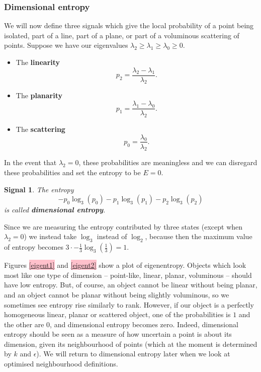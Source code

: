 \documentclass[a4paper,11pt,twoside]{article}
\newtheorem*{signals}{Signal}
\theoremstyle{definition}
\theoremstyle{remark}
\newcommand{\sh}[1]{\colorbox{pink}{#1}}
\newcommand{\lnk}[1]{\sh{\hyperref[#1]{\ref*{#1}}}}
\newenvironment{sigs}
   {\colorlet{shadecolor}{green!50}\begin{shaded}\begin{signals}}
   {\end{signals}\end{shaded}}
\begin{document}
\subsubsection{Dimensional entropy}
We will now define three signals which give the local probability of a point being isolated, part of a line, part of a plane, or part of a voluminous scattering of points. Suppose we have our eigenvalues $\lambda_2\geqslant \lambda_1\geqslant \lambda_0\geqslant 0$.
\begin{itemize}
\item The \textbf{linearity}
\begin{displaymath}
p_2=\frac{\lambda_2-\lambda_1}{\lambda_2}.
\end{displaymath}
\item The \textbf{planarity}
\begin{displaymath}
p_1=\frac{\lambda_1-\lambda_0}{\lambda_2}.
\end{displaymath}
\item The \textbf{scattering}
\begin{displaymath}
p_0=\frac{\lambda_0}{\lambda_2}.
\end{displaymath}
\end{itemize}
In the event that $\lambda_2=0$, these probabilities are meaningless and we can disregard these probabilities and set the entropy to be $E=0$. 
\begin{sigs}The entropy
\begin{displaymath}
-p_0\log_3(p_0)-p_1\log_3(p_1)-p_2\log_3(p_2)
\end{displaymath}
is called \textbf{dimensional entropy}.
\end{sigs} 
Since we are measuring the entropy contributed by three states (except when $\lambda_2=0$) we instead take $\log_3$ instead of $\log_2$, because then the maximum value of entropy becomes $3\cdot -\frac{1}{3}\log_3(\frac{1}{3})=1$.

Figures \lnk{eigent1} and \lnk{eigent2} show a plot of eigenentropy. Objects which look most like one type of dimension -- point-like, linear, planar, voluminous -- should have low entropy. But, of course, an object cannot be linear without being planar, and an object cannot be planar without being slightly voluminous, so we sometimes see entropy rise similarly to rank. However, if our object is a perfectly homogeneous linear, planar or scattered object, one of the probabilities is $1$ and the other are $0$, and dimensional entropy becomes zero. Indeed, dimensional entropy should be seen as a measure of how uncertain a point is about its dimension, given its neighbourhood of points (which at the moment is determined by $k$ and $\epsilon$). We will return to dimensional entropy later when we look at optimised neighbourhood definitions.
\end{document}

